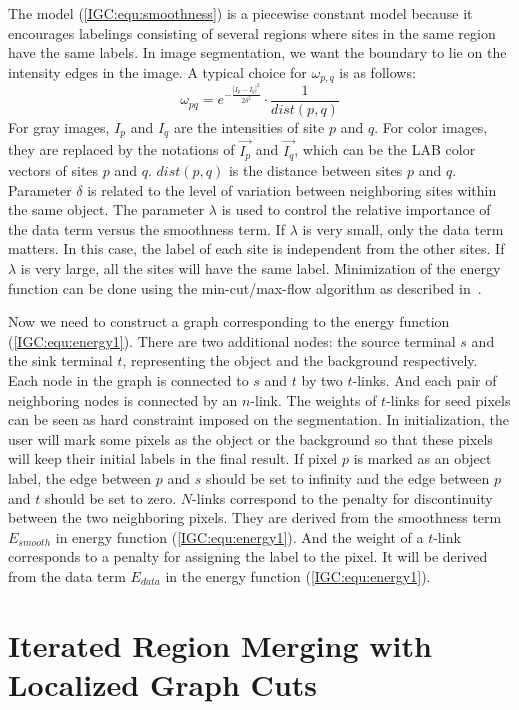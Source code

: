     The model (\ref{IGC:equ:smoothness}) is a piecewise constant model because it encourages labelings consisting of several regions where sites in the same region have the same labels. In image segmentation, we want the boundary to lie on the intensity edges in the image. A typical choice for $\omega_{p,q}$ is as follows:
    \begin{equation}
    \omega_{pq}=e^{-\frac{|I_p-I_q|^2}{2\delta^2}}\cdot
    \frac{1}{dist(p,q)}
    \end{equation}
     For gray images, $I_p$ and $I_q$ are the intensities of site $p$ and $q$. For color images, they are replaced by the notations of  $\vec{I_p}$ and $\vec{I_q}$, which can be the LAB color vectors of sites $p$ and $q$.  $dist(p,q)$ is the distance between sites $p$ and $q$. Parameter $\delta$ is related to the level of variation between neighboring sites within the same object. The parameter $\lambda$ is used to control the relative importance of the data term versus the smoothness term. If $\lambda$ is very small, only the data term matters. In this case, the label of each site is independent from the other sites. If $\lambda$ is very large, all the sites will have the same label. Minimization of the energy function can be done using the min-cut/max-flow
    algorithm as described in~\cite{Yuri01}.

    Now we need to construct a graph corresponding to the energy  function (\ref{IGC:equ:energy1}). There are two additional nodes: the source terminal $s$ and the sink terminal $t$, representing the object and the background respectively. Each node in the graph is connected to $s$ and $t$ by two $t$-links. And each pair of neighboring nodes is connected by an $n$-link. The weights of $t$-links for seed pixels can be seen as hard constraint imposed on the segmentation. In initialization, the user will mark some pixels as the object or the background so that these pixels will keep their initial labels in the final result. If pixel $p$ is marked as an object label, the edge between $p$ and $s$ should be set to infinity and the edge between $p$ and $t$ should be set to zero.  $N$-links correspond to the penalty for discontinuity between the two neighboring pixels. They are derived from the smoothness term $E_{smooth}$ in energy function (\ref{IGC:equ:energy1}). And the weight of a $t$-link corresponds to a penalty for assigning the label to the pixel. It will be derived from the data term $E_{data}$ in the energy function (\ref{IGC:equ:energy1}).

\section{Iterated Region Merging with Localized Graph Cuts}\label{sec:3}
